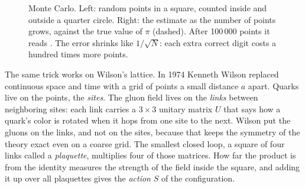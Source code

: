 \begin{figure}[htbp]
\centering

\caption{Monte Carlo. Left: random points in a square, counted inside and outside a
quarter circle. Right: the estimate as the number of points grows, against the true
value of $\pi$ (dashed). After 100\,000 points it reads \mcFinalEst. The error
shrinks like $1/\sqrt{N}$: each extra correct digit costs a hundred times more
points.}
\end{figure}

The same trick works on Wilson's lattice. In 1974 Kenneth Wilson replaced
continuous space and time with a grid of points a small distance $a$ apart. Quarks
live on the points, the \emph{sites}. The gluon field lives on the \emph{links}
between neighboring sites: each link carries a $3\times3$ unitary matrix $U$ that
says how a quark's color is rotated when it hops from one site to the next. Wilson
put the gluons on the links, and not on the sites, because that keeps the symmetry
of the theory exact even on a coarse grid. The smallest closed loop, a square of
four links called a \emph{plaquette}, multiplies four of those matrices. How far
the product is from the identity measures the strength of the field inside the
square, and adding it up over all plaquettes gives the \emph{action} $S$ of the
configuration.

